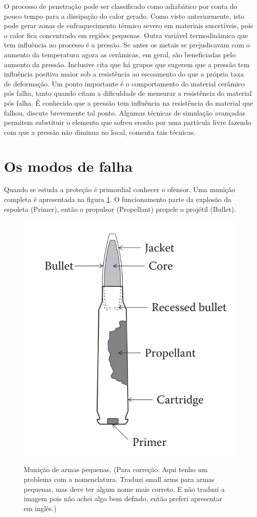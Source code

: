 O processo de penetração pode ser classificado como adiabático por conta do pouco tempo para a dissipação do calor gerado. Como visto anteriormente, isto pode gerar zonas de enfraquecimento térmico severo em materiais suscetíveis, pois o calor fica concentrado em regiões pequenas. Outra variável termodinâmica que tem influência no processo é a pressão. Se antes os metais se prejudicavam com o aumento da temperatura agora as cerâmicas, em geral, são beneficiadas pelo aumento da pressão. Inclusive \cite{Hazell} cita que há grupos que sugerem que a pressão tem influência positiva maior sob a resistência ao escoamento do que a própria taxa de deformação.
Um ponto importante é o comportamento do material cerâmico pós falha, tanto \cite{Hazell} quando \cite{holmquist_johnson_2002} citam a dificuldade de mensurar a resistência do material pós falha. É conhecido que a pressão tem influência na resistência do material que falhou, \cite{holmquist_johnson_2002} discute brevemente tal ponto. Algumas técnicas de simulação avançadas permitem substituir o elemento que sofreu erosão por uma partícula livre fazendo com que a pressão não diminua no local, \cite{johnson_2011} comenta tais técnicas.\\

\section{Os modos de falha}

Quando se estuda a proteção é primordial conhecer o ofensor. Uma munição completa é apresentada na figura \ref{fig:projetilinteiro}. O funcionamento parte da explosão da espoleta (Primer), então o propulsor (Propellant) propele o projétil (Bullet).\\
\begin{figure}[H]
	\centering
	\caption{Munição de armas pequenas. (Para correção: Aqui tenho um problema com a nomenclatura. Traduzi small arms para armas pequenas, mas deve ter algum nome mais correto. E não traduzi a imagem pois não achei algo bem defindo, então preferi apresentar em inglês.)}
	\includegraphics[width=0.5\linewidth]{images/projetil_inteiro.png}
	\label{fig:projetilinteiro}
\end{figure}


